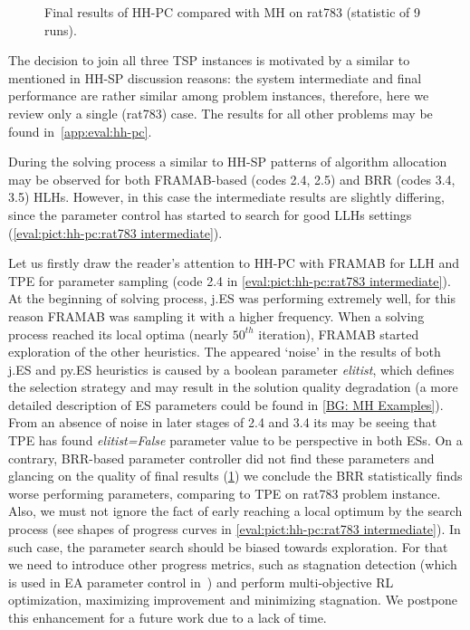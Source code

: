\begin{figure}[b]
	\centering
	\vspace{-20pt}
	
	\caption{Final results of HH-PC compared with MH on rat783 (statistic of 9 runs).}
	\vspace{-5pt}
	\label{eval:pict:hh-pc:rat783 final}
\end{figure}

The decision to join all three TSP instances is motivated by a similar to mentioned in HH-SP discussion reasons: the system intermediate and final performance are rather similar among problem instances, therefore, here we review only a single (rat783) case. The results for all other problems may be found in~\cref{app:eval:hh-pc}.

During the solving process a similar to HH-SP patterns of algorithm allocation may be observed for both FRAMAB-based (codes 2.4, 2.5) and BRR (codes 3.4, 3.5) HLHs. However, in this case the intermediate results are slightly differing, since the parameter control has started to search for good LLHs settings (\cref{eval:pict:hh-pc:rat783 intermediate}). 

Let us firstly draw the reader's attention to HH-PC with FRAMAB for LLH and TPE for parameter sampling (code 2.4 in \cref{eval:pict:hh-pc:rat783 intermediate}). At the beginning of solving process, j.ES was performing extremely well, for this reason FRAMAB was sampling it with a higher frequency. When a solving process reached its local optima (nearly $50^{th}$ iteration), FRAMAB started exploration of the other heuristics. The appeared `noise' in the results of both j.ES and py.ES heuristics is caused by a boolean parameter \emph{elitist}, which defines the selection strategy and may result in the solution quality degradation (a more detailed description of ES parameters could be found in \cref{BG: MH Examples}). From an absence of noise in later stages of 2.4 and 3.4 its may be seeing that TPE has found \emph{elitist=False} parameter value to be perspective in both ESs. On a contrary, BRR-based parameter controller did not find these parameters and glancing on the quality of final results (\cref{eval:pict:hh-pc:rat783 final}) we conclude the BRR statistically finds worse performing parameters, comparing to TPE on rat783 problem instance. Also, we must not ignore the fact of early reaching a local optimum by the search process (see shapes of progress curves in \cref{eval:pict:hh-pc:rat783 intermediate}). In such case, the parameter search should be biased towards exploration. For that we need to introduce other progress metrics, such as stagnation detection (which is used in EA parameter control in~\cite{karafotias2014generic}) and perform multi-objective RL optimization, maximizing improvement and minimizing stagnation. We postpone this enhancement for a future work due to a lack of time.

